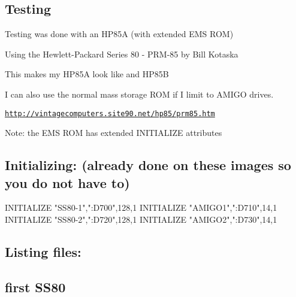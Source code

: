 \subsection*{Testing}


\begin{DoxyItemize}
\item Testing was done with an H\+P85A (with extended E\+MS R\+OM)
\begin{DoxyItemize}
\item Using the Hewlett-\/\+Packard Series 80 -\/ P\+R\+M-\/85 by Bill Kotaska
\item This makes my H\+P85A look like and H\+P85B
\begin{DoxyItemize}
\item I can also use the normal mass storage R\+OM if I limit to A\+M\+I\+GO drives.
\item \href{http://vintagecomputers.site90.net/hp85/prm85.htm}{\tt http\+://vintagecomputers.\+site90.\+net/hp85/prm85.\+htm}
\end{DoxyItemize}
\end{DoxyItemize}
\item Note\+: the E\+MS R\+OM has extended I\+N\+I\+T\+I\+A\+L\+I\+ZE attributes 
\begin{DoxyPre}
\section*{Initializing: (already done on these images so you do not have to)}\end{DoxyPre}

\end{DoxyItemize}


\begin{DoxyPre}
  INITIALIZE "SS80-1",":D700",128,1
  INITIALIZE "AMIGO1",":D710",14,1
  INITIALIZE "SS80-2",":D720",128,1
  INITIALIZE "AMIGO2",":D730",14,1\end{DoxyPre}



\begin{DoxyPre}\section*{Listing files:}\end{DoxyPre}



\begin{DoxyPre}
\section*{first SS80}\end{DoxyPre}



